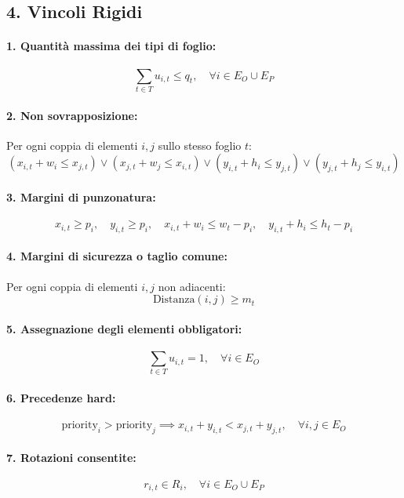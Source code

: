 \subsection*{4. Vincoli Rigidi}

\paragraph{1. Quantità massima dei tipi di foglio:}
\[
\sum_{t \in T} u_{i,t} \leq q_t, \quad \forall i \in E_O \cup E_P
\]

\paragraph{2. Non sovrapposizione:}
Per ogni coppia di elementi \( i, j \) sullo stesso foglio \( t \):
\[
(x_{i,t} + w_i \leq x_{j,t}) \lor (x_{j,t} + w_j \leq x_{i,t}) \lor (y_{i,t} + h_i \leq y_{j,t}) \lor (y_{j,t} + h_j \leq y_{i,t})
\]

\paragraph{3. Margini di punzonatura:}
\[
x_{i,t} \geq p_i, \quad y_{i,t} \geq p_i, \quad x_{i,t} + w_i \leq w_t - p_i, \quad y_{i,t} + h_i \leq h_t - p_i
\]

\paragraph{4. Margini di sicurezza o taglio comune:}
Per ogni coppia di elementi \( i, j \) non adiacenti:
\[
\text{Distanza}(i,j) \geq m_t
\]

\paragraph{5. Assegnazione degli elementi obbligatori:}
\[
\sum_{t \in T} u_{i,t} = 1, \quad \forall i \in E_O
\]

\paragraph{6. Precedenze hard:}
\[
\text{priority}_i > \text{priority}_j \implies x_{i,t} + y_{i,t} < x_{j,t} + y_{j,t}, \quad \forall i,j \in E_O
\]

\paragraph{7. Rotazioni consentite:}
\[
r_{i,t} \in R_i, \quad \forall i \in E_O \cup E_P
\]

